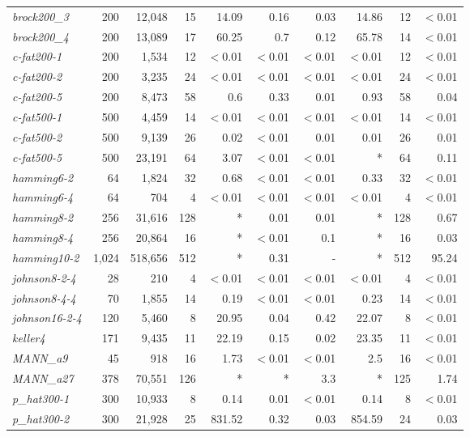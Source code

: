\begin{table}[tbh]
\begin{tabular}{l@{\hspace{6pt}}r@{\hspace{6pt}}r@{\hspace{6pt}}r@{\hspace{6pt}}|@{\hspace{6pt}}r@{\hspace{6pt}}r@{\hspace{6pt}}r@{\hspace{6pt}}r@{\hspace{6pt}}|@{\hspace{6pt}}r@{\hspace{3pt}}r}
{\it brock200\_3}	&	200		&	12,048	&	15	&	14.09	&	0.16		&	0.03		&	14.86	&	12	&	$<$0.01	\\
{\it brock200\_4}	&	200		&	13,089	&	17	&	60.25	&	0.7		&	0.12		&	65.78	&	14	&	$<$0.01	\\
{\it c-fat200-1}		&	200		&	1,534	&	12	&	$<$0.01	&	$<$0.01	&	$<$0.01	&	$<$0.01	&	12	&	$<$0.01	\\
{\it c-fat200-2}		&	200		&	3,235	&	24	&	$<$0.01	&	$<$0.01	&	$<$0.01	&	$<$0.01	&	24	&	$<$0.01	\\
{\it c-fat200-5}		&	200		&	8,473	&	58	&	0.6		&	0.33		&	0.01		&	0.93		&	58	&	0.04	\\
{\it c-fat500-1}		&	500		&	4,459	&	14	&	$<$0.01	&	$<$0.01	&	$<$0.01	&	$<$0.01	&	14	&	$<$0.01	\\
{\it c-fat500-2}		&	500		&	9,139	&	26	&	0.02		&	$<$0.01	&	0.01		&	0.01		&	26	&	0.01	\\
{\it c-fat500-5}		&	500		&	23,191	&	64	&	3.07		&	$<$0.01	&	$<$0.01	&	*		&	64	&	0.11	\\
{\it hamming6-2}	&	64		&	1,824	&	32	&	0.68		&	$<$0.01	&	$<$0.01	&	0.33		&	32	&	$<$0.01	\\
{\it hamming6-4}	&	64		&	704		&	4	&	$<$0.01	&	$<$0.01	&	$<$0.01	&	$<$0.01	&	4	&	$<$0.01	\\
{\it hamming8-2}	&	256		&	31,616	&	128	&	*		&	0.01		&	0.01		&	*		&	128	&	0.67	\\
{\it hamming8-4}	&	256		&	20,864	&	16	&	*		&	$<$0.01	&	0.1		&	*		&	16	&	0.03	\\
{\it hamming10-2}	&	1,024	&	518,656	&	512	&	*		&	0.31		&	-		&	*		&	512	&	95.24	\\
{\it johnson8-2-4}	&	28		&	210		&	4	&	$<$0.01	&	$<$0.01	&	$<$0.01	&	$<$0.01	&	4	&	$<$0.01	\\
{\it johnson8-4-4}	&	70		&	1,855	&	14	&	0.19		&	$<$0.01	&	$<$0.01	&	0.23		&	14	&	$<$0.01	\\
{\it johnson16-2-4}	&	120		&	5,460	&	8	&	20.95	&	0.04		&	0.42		&	22.07	&	8	&	$<$0.01	\\
{\it keller4}		&	171		&	9,435	&	11	&	22.19	&	0.15		&	0.02		&	23.35	&	11	&	$<$0.01	\\
{\it MANN\_a9}		&	45		&	918		&	16	&	1.73		&	$<$0.01	&	$<$0.01	&	2.5		&	16	&	$<$0.01	\\
{\it MANN\_a27}	&	378		&	70,551	&	126	&	*		&	*		&	3.3		&	*		&	125	&	1.74	\\
{\it p\_hat300-1}	&	300		&	10,933	&	8	&	0.14		&	0.01		&	$<$0.01	&	0.14		&	8	&	$<$0.01	\\
{\it p\_hat300-2}	&	300		&	21,928	&	25	&	831.52	&	0.32		&	0.03		&	854.59	&	24	&	0.03	\\

\end{tabular}
\end{table}
